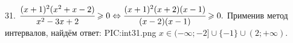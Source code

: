 31. $\cfrac{(x+1)^2(x^2+x-2)}{x^2-3x+2}\geqslant0\Leftrightarrow\cfrac{(x+1)^2(x+2)(x-1)}{(x-2)(x-1)}\geqslant0.$
Применив метод интервалов, найдём ответ:
{{PIC:int31.png}}
$x\in(-\infty;-2]\cup\{-1\}\cup(2;+\infty).$\\
